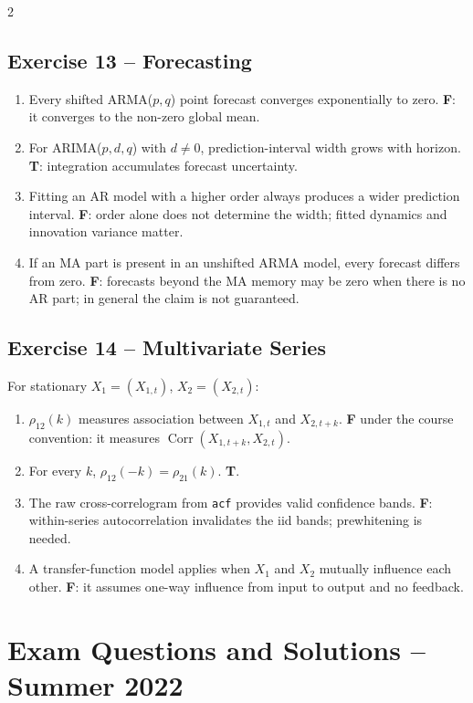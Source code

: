 \documentclass[9pt,a4paper]{extarticle}
\begin{document}
\begin{multicols}{2}
\subsection*{Exercise 13 -- Forecasting}
\begin{enumerate}[label=\alph*),leftmargin=4mm]
\item Every shifted ARMA(\(p,q\)) point forecast converges exponentially to zero. \textbf{F}: it converges to the non-zero global mean.
\item For ARIMA(\(p,d,q\)) with \(d\neq0\), prediction-interval width grows with horizon. \textbf{T}: integration accumulates forecast uncertainty.
\item Fitting an AR model with a higher order always produces a wider prediction interval. \textbf{F}: order alone does not determine the width; fitted dynamics and innovation variance matter.
\item If an MA part is present in an unshifted ARMA model, every forecast differs from zero. \textbf{F}: forecasts beyond the MA memory may be zero when there is no AR part; in general the claim is not guaranteed.
\end{enumerate}

\subsection*{Exercise 14 -- Multivariate Series}
For stationary \(X_1=(X_{1,t})\), \(X_2=(X_{2,t})\):
\begin{enumerate}[label=\alph*),leftmargin=4mm]
\item \(\rho_{12}(k)\) measures association between \(X_{1,t}\) and \(X_{2,t+k}\). \textbf{F} under the course convention: it measures \(\operatorname{Corr}(X_{1,t+k},X_{2,t})\).
\item For every \(k\), \(\rho_{12}(-k)=\rho_{21}(k)\). \textbf{T}.
\item The raw cross-correlogram from \texttt{acf} provides valid confidence bands. \textbf{F}: within-series autocorrelation invalidates the iid bands; prewhitening is needed.
\item A transfer-function model applies when \(X_1\) and \(X_2\) mutually influence each other. \textbf{F}: it assumes one-way influence from input to output and no feedback.
\end{enumerate}

\section{Exam Questions and Solutions -- Summer 2022}


\end{multicols}
\end{document}
